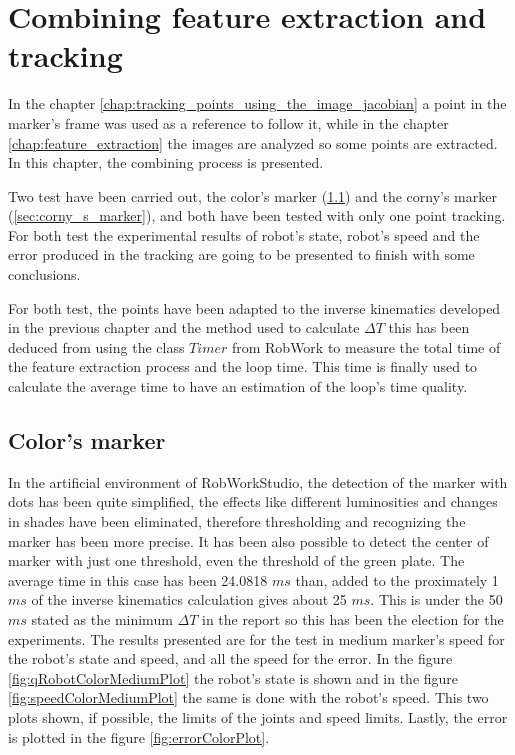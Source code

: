 









\chapter{Combining feature extraction and tracking} %
\label{chap:combining_feature_extraction_and_tracking}
	In the chapter \ref{chap:tracking_points_using_the_image_jacobian} a point in the marker's frame was used as a reference to follow it, while in the chapter \ref{chap:feature_extraction} the images are analyzed so some points are extracted. 
	In this chapter, the combining process is presented.

	Two test have been carried out, the color's marker (\ref{sec:color_s_marker}) and the corny's marker (\ref{sec:corny_s_marker}), and both have been tested with only one point tracking.
	For both test the experimental results of robot's state, robot's speed and the error produced in the tracking are going to be presented to finish with some conclusions.

	For both test, the points have been adapted to the inverse kinematics developed in the previous chapter and the method used to calculate $\Delta T$ this has been deduced from using the class $Timer$ from RobWork to measure the total time of the feature extraction process and the loop time. This time is finally used to calculate the average time to have an estimation of the loop's time quality.

	\section{Color's marker} %
	\label{sec:color_s_marker}
		In the artificial environment of RobWorkStudio, the detection of the marker with dots has been quite simplified, the effects like different luminosities and changes in shades have been eliminated, therefore thresholding and recognizing the marker has been more precise. 
		It has been also possible to detect the center of marker with just one threshold, even the threshold of the green plate.
		The average time in this case has been 24.0818 $ms$ than, added to the proximately 1 $ms$ of the inverse kinematics calculation gives about 25 $ms$. 
		This is under the 50 $ms$ stated as the minimum $\Delta T$ in the report so this has been the election for the experiments. 
		The results presented are for the test in medium marker's speed for the robot's state and speed, and all the speed for the error. 
		In the figure \ref{fig:qRobotColorMediumPlot} the robot's state is shown and in the figure \ref{fig:speedColorMediumPlot} the same is done with the robot's speed. This two plots shown, if possible, the limits of the joints and speed limits. Lastly, the error is plotted in the figure \ref{fig:errorColorPlot}.
		

